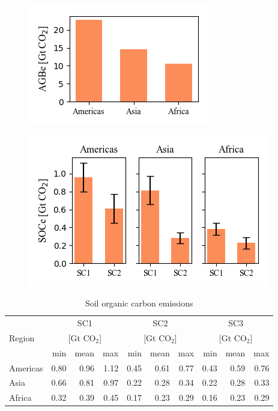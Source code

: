 	\begin{figure}[ht]
			\centering
			\includegraphics[scale=1]{img/agbe}
			\caption[Ecosystem service values]{}
			\label{fig:agbe}
	\end{figure}
	\begin{figure}[ht]
		\centering
		\includegraphics[scale=1]{img/soce}
		\caption[Ecosystem service values]{}
		\label{fig:soce}
	\end{figure}


	\begin{table}[ht]
		\centering
		\caption[Soil organic carbon emissions]{Soil organic carbon emissions}
		\label{tab:soce_tab}
		\begin{tabular}{lrrrrrrrrr}
			\hline
			\multirow{3}{*}{Region} & \multicolumn{3}{c}{SC1}& \multicolumn{3}{c}{SC2} & \multicolumn{3}{c}{SC3} \\
			& \multicolumn{3}{c}{[Gt CO$_2$]}& \multicolumn{3}{c}{[Gt CO$_2$]} & \multicolumn{3}{c}{[Gt CO$_2$]} \\
			& min & mean & max & min & mean & max & min & mean & max \\\hline
			Americas & 0.80 & 0.96 & 1.12 & 0.45 & 0.61 & 0.77 & 0.43 & 0.59 & 0.76 \\
			Asia & 0.66 & 0.81 & 0.97 & 0.22 & 0.28 & 0.34 & 0.22 & 0.28 & 0.33 \\
			Africa & 0.32 & 0.39 & 0.45 & 0.17 & 0.23 & 0.29 & 0.16 & 0.23 & 0.29 \\\hline
		\end{tabular}
	\end{table}

